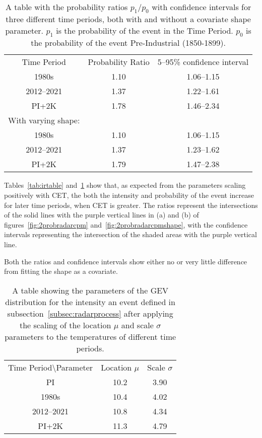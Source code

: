 \begin{table}[H]
   \centering
    \begin{tabular}{c c c}
        Time Period & Probability Ratio & 5--95\% confidence interval \\
        1980s & 1.10 & 1.06--1.15 \\
        2012--2021 & 1.37 & 1.22--1.61 \\
        PI+2K & 1.78 & 1.46--2.34 \\
        With varying shape: && \\
        1980s & 1.10 & 1.06--1.15 \\
        2012--2021 & 1.37 & 1.23--1.62 \\
        PI+2K & 1.79 & 1.47--2.38 \\
    \end{tabular}
    \caption{A table with the probability ratios $p_1/p_0$ with confidence intervals for three different time periods,
        both with and without a covariate shape parameter.
    $p_1$ is the probability of the event in the Time Period.
    $p_0$ is the probability of the event Pre-Industrial (1850-1899).}
    \label{tab:prtable}
\end{table}

Tables~\ref{tab:irtable} and~\ref{tab:prtable} show that,
    as expected from the parameters scaling positively with CET,
    the both the intensity and probability of the event increase for later time periods,
    when CET is greater.
The ratios represent the intersections of the solid lines with the purple vertical lines in (a) and (b)
    of figures~\ref{fig:2probradarcpm} and~\ref{fig:2probradarcpmshape},
    with the confidence intervals representing the intersection of the shaded areas with the purple vertical line.

Both the ratios and confidence intervals show either no or very little difference from fitting the shape as a covariate.

\begin{table}[H]
    \centering
    \begin{tabular}{c c c}
        Time Period\textbackslash Parameter & Location $\mu$ & Scale $\sigma$ \\
        PI & 10.2 & 3.90 \\
        1980s & 10.4 & 4.02 \\
        2012--2021 & 10.8 & 4.34 \\
        PI+2K & 11.3 & 4.79
    \end{tabular}
    \caption{A table showing the parameters of the GEV distribution for the intensity an event defined in subsection~\ref{subsec:radarprocess} after
        applying the scaling of the location $\mu$ and scale $\sigma$ parameters to the temperatures of different time periods.}
    \label{tab:0.95params}
\end{table}

